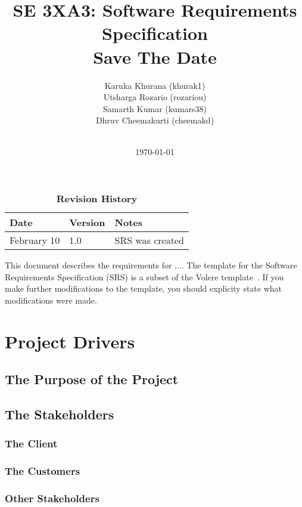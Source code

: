\documentclass[12pt, titlepage]{article}
\title{SE 3XA3: Software Requirements Specification\\Save The Date}
\author{
        Karuka Khurana (khurak1)\\
        Utsharga Rozario (rozariou)\\
        Samarth Kumar (kumars38)\\
        Dhruv Cheemakurti (cheemakd)\\
        \\
}
\date{\today}
\begin{document}
\maketitle

\tableofcontents
\listoftables
\listoffigures

\begin{table}[bp]
\caption{\bf Revision History}
\begin{tabularx}{\textwidth}{p{3cm}p{2cm}X}
\toprule {\bf Date} & {\bf Version} & {\bf Notes}\\
\midrule
February 10 & 1.0 & SRS was created\\
\bottomrule
\end{tabularx}
\end{table}

\newpage


This document describes the requirements for ....  The template for the Software
Requirements Specification (SRS) is a subset of the Volere
template~\citep{RobertsonAndRobertson2012}.  If you make further modifications
to the template, you should explicity state what modifications were made.

\section{Project Drivers}

\subsection{The Purpose of the Project}

\subsection{The Stakeholders}

\subsubsection{The Client}

\subsubsection{The Customers}

\subsubsection{Other Stakeholders}
\end{document}
